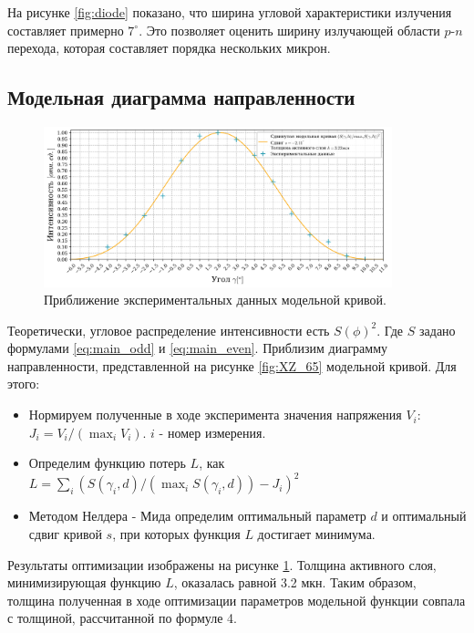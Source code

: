 \documentclass[a4paper, 12pt]{extarticle}
\begin{document}
На рисунке \ref{fig:diode} показано, что ширина угловой характеристики излучения составляет примерно \(7^\circ\). Это позволяет оценить ширину излучающей области $p$-$n$ перехода, которая составляет порядка нескольких микрон.


\subsection*{\textcolor{sub_header}{Модельная диаграмма направленности}}

\begin{figure}[htbp]
    \centering
    \includegraphics[width = 0.9\textwidth]{pics/model.png}
    \caption{Приближение экспериментальных данных модельной кривой.}
    \label{fig:model}
\end{figure}

Теоретически, угловое распределение интенсивности есть $S(\phi)^{2}$. Где $S$ задано формулами \ref{eq:main_odd} и \ref{eq:main_even}. Приблизим диаграмму направленности, представленной на рисунке \ref{fig:XZ_65} модельной кривой. Для этого:
\begin{itemize}
    \item Нормируем полученные в ходе эксперимента значения напряжения $V_i$: $J_i = V_i / (\max_i V_i)$. $i$ - номер измерения.
    \item Определим функцию потерь $L$, как $L = \sum_i (S(\gamma_i, d) / (\max_{i} S(\gamma_i, d)) - J_i)^{2}$ 
    \item Методом Нелдера - Мида определим оптимальный параметр $d$ и оптимальный сдвиг кривой $s$, при которых функция $L$ достигает минимума.
\end{itemize}


Результаты оптимизации изображены на рисунке \ref{fig:model}. Толщина активного слоя, минимизирующая функцию $L$, оказалась равной 3.2 мкн. Таким образом, толщина полученная в ходе оптимизации параметров модельной функции совпала с толщиной, рассчитанной по формуле 4.
\end{document}
